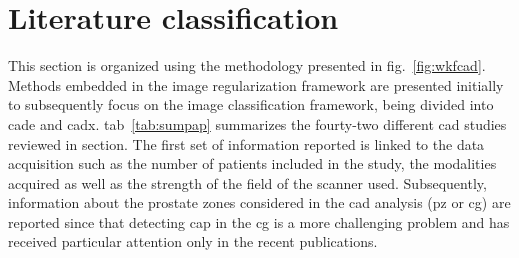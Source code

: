 

\section{Literature classification}\label{sec:chp3:Literature-classification}

This section is organized using the methodology presented in \acs{fig}.~\ref{fig:wkfcad}.
Methods embedded in the image regularization framework are presented initially to subsequently focus on the image classification framework, being divided into \ac{cade} and \ac{cadx}.
\Acl{tab}~\ref{tab:sumpap} summarizes the fourty-two different \ac{cad} studies reviewed in section.
The first set of information reported is linked to the data acquisition such as the number of patients included in the study, the modalities acquired as well as the strength of the field of the scanner used.
Subsequently, information about the prostate zones considered in the \ac{cad} analysis (\ac{pz} or \ac{cg}) are reported since that detecting \ac{cap} in the \ac{cg} is a more challenging problem and has received particular attention only in the recent publications.



